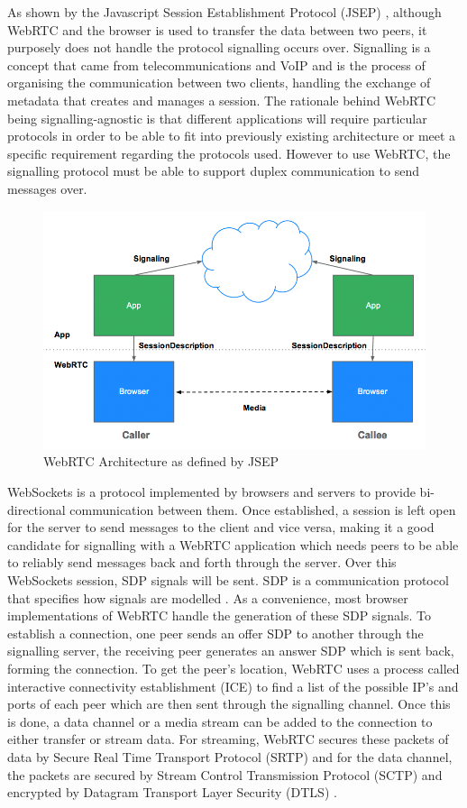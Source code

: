 \documentclass[]{report}
\begin{document}
	As shown by the Javascript Session Establishment Protocol (JSEP) \cite{JSEP}, although WebRTC and the browser is used to transfer the data between two peers, it purposely does not handle the protocol signalling occurs over. Signalling is a concept that came from telecommunications and VoIP and is the process of organising the communication between two clients, handling the exchange of metadata that creates and manages a session. The rationale behind WebRTC being signalling-agnostic is that different applications will require particular protocols in order to be able to fit into previously existing architecture or meet a specific requirement regarding the protocols used. However to use WebRTC, the signalling protocol must be able to support duplex communication to send messages over.
	
	\begin{figure}[H]
		\caption{WebRTC Architecture as defined by JSEP \cite{JSEP}}
		\includegraphics[scale=0.4]{jsep.png}
	\end{figure}
	
	WebSockets is a protocol implemented by browsers and servers to provide bi-directional communication between them\cite{WebSockets}. Once established, a session is left open for the server to send messages to the client and vice versa, making it a good candidate for signalling with a WebRTC application which needs peers to be able to reliably send messages back and forth through the server. Over this WebSockets session, SDP signals will be sent. SDP is a communication protocol that specifies how signals are modelled \cite{SDP Over WebSockets}. As a convenience, most browser implementations of WebRTC handle the generation of these SDP signals. To establish a connection, one peer sends an offer SDP to another through the signalling server, the receiving peer generates an answer SDP which is sent back, forming the connection. To get the peer's location, WebRTC uses a process called interactive connectivity establishment (ICE) to find a list of the possible IP's and ports of each peer which are then sent through the signalling channel. Once this is done, a data channel or a media stream can be added to the connection to either transfer or stream data. For streaming, WebRTC secures these packets of data by Secure Real Time Transport Protocol (SRTP) and for the data channel, the packets are secured by Stream Control Transmission Protocol (SCTP) and encrypted by Datagram Transport Layer Security (DTLS) \cite{WebRTC Data Channel Establishment Protocol}. 
	
\end{document}
